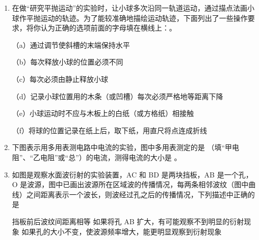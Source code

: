 \documentclass[\gkver]{gaokaozhenti}
\begin{document}
\begin{enumerate}
\jdanswer{
$1.4\UW$
}

\item
在做“研究平抛运动”的实验时，让小球多次沿同一轨道运动，通过描点法画小球作平抛运动的轨迹。为了能较准确地描绘运动轨迹，下面列出了一些操作要求，将你认为正确的选项前面的字母填在横线上：。

（a）通过调节使斜槽的末端保持水平

（b）每次释放小球的位置必须不同

（c）每次必须由静止释放小球

（d）记录小球位置用的木条（或凹槽）每次必须严格地等距离下降

（e）小球运动时不应与木板上的白纸（或方格纸）相接触

（f）将球的位置记录在纸上后，取下纸，用直尺将点连成折线


\item
下图表示用多用表测电路中电流的实验，图中多用表测定的是 （填“甲电阻”、“乙电阻”或“总”）的电流，测得电流的大小是 \tkanswer[1.8cm]{$50\UmA$}。

\onepicture[align=right, w=13.59cm]{}


\item
如图是观察水面波衍射的实验装置，AC 和 BD 是两块挡板，AB 是一个孔，O 是波源，图中已画出波源所在区域波的传播情况，每两条相邻波纹（图中曲线）之间距离表示一个波长，则波经过孔之后的传播情况，下列描述中正确的是

\onepicture[w=4.14cm]{}

{挡板前后波纹间距离相等}
{如果将孔 AB 扩大，有可能观察不到明显的衍射现象}
{如果孔的大小不变，使波源频率增大，能更明显观察到衍射现象}


\end{enumerate}
\end{document}
